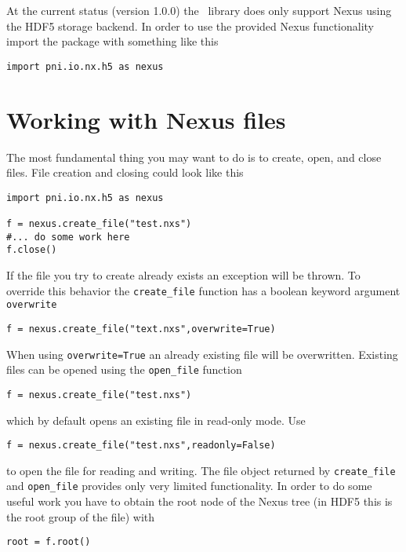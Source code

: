
At the current status (version 1.0.0) the \pniio\ library does only support
Nexus using the HDF5 storage backend. In order to use the provided Nexus
functionality import the package with something like this
\begin{verbatim}
import pni.io.nx.h5 as nexus
\end{verbatim}

\section{Working with Nexus files}

The most fundamental thing you may want to do is to create, open, and close
files. File creation and closing could look like this 
\begin{verbatim}
import pni.io.nx.h5 as nexus

f = nexus.create_file("test.nxs")
#... do some work here
f.close()
\end{verbatim}

If the file you try to create already exists an exception will be thrown. To
override this behavior the {\tt create\_file} function has a boolean 
keyword argument {\tt overwrite} 
\begin{verbatim}
f = nexus.create_file("text.nxs",overwrite=True)
\end{verbatim}
When using {\tt overwrite=True} an already existing file will be overwritten. 
Existing files can be opened using the {\tt open\_file} function
\begin{verbatim}
f = nexus.create_file("test.nxs")
\end{verbatim}
which by default opens an existing file in read-only mode. Use
\begin{verbatim}
f = nexus.create_file("test.nxs",readonly=False)
\end{verbatim}
to open the file for reading and writing.
The file object returned by {\tt create\_file} and {\tt open\_file} 
provides only very limited functionality. 
In order to do some useful work you have to obtain the root node of the 
Nexus tree (in HDF5 this is the root group of the file) with
\begin{verbatim}
root = f.root()
\end{verbatim}


